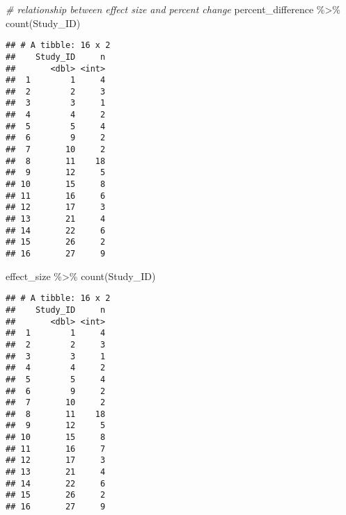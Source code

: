 \documentclass[
]{article}
\newenvironment{Shaded}{\begin{snugshade}}{\end{snugshade}}
\newcommand{\CommentTok}[1]{\textcolor[rgb]{0.56,0.35,0.01}{\textit{#1}}}
\newcommand{\FunctionTok}[1]{\textcolor[rgb]{0.00,0.00,0.00}{#1}}
\newcommand{\NormalTok}[1]{#1}
\newcommand{\SpecialCharTok}[1]{\textcolor[rgb]{0.00,0.00,0.00}{#1}}
\begin{document}
\begin{Shaded}
\begin{Highlighting}[]
\CommentTok{\# relationship between effect size and percent change }
\NormalTok{percent\_difference }\SpecialCharTok{\%\textgreater{}\%} 
  \FunctionTok{count}\NormalTok{(Study\_ID)}
\end{Highlighting}
\end{Shaded}

\begin{verbatim}
## # A tibble: 16 x 2
##    Study_ID     n
##       <dbl> <int>
##  1        1     4
##  2        2     3
##  3        3     1
##  4        4     2
##  5        5     4
##  6        9     2
##  7       10     2
##  8       11    18
##  9       12     5
## 10       15     8
## 11       16     6
## 12       17     3
## 13       21     4
## 14       22     6
## 15       26     2
## 16       27     9
\end{verbatim}

\begin{Shaded}
\begin{Highlighting}[]
\NormalTok{effect\_size }\SpecialCharTok{\%\textgreater{}\%} 
  \FunctionTok{count}\NormalTok{(Study\_ID)}
\end{Highlighting}
\end{Shaded}

\begin{verbatim}
## # A tibble: 16 x 2
##    Study_ID     n
##       <dbl> <int>
##  1        1     4
##  2        2     3
##  3        3     1
##  4        4     2
##  5        5     4
##  6        9     2
##  7       10     2
##  8       11    18
##  9       12     5
## 10       15     8
## 11       16     7
## 12       17     3
## 13       21     4
## 14       22     6
## 15       26     2
## 16       27     9
\end{verbatim}
\end{document}
